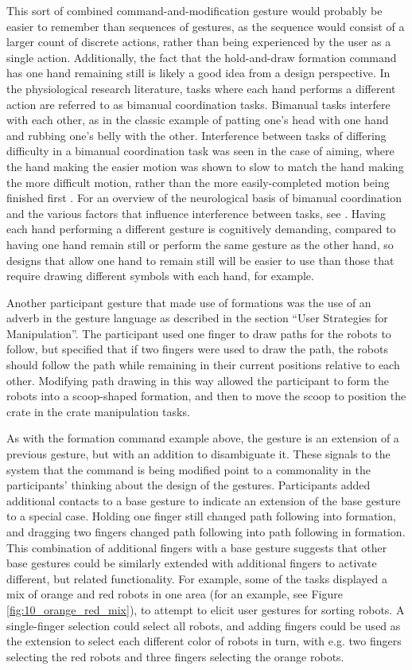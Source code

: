 This sort of combined command-and-modification gesture would probably be easier to remember than sequences of gestures, as the sequence would consist of a larger count of discrete actions, rather than being experienced by the user as a single action. 
Additionally, the fact that the hold-and-draw formation command has one hand remaining still is likely a good idea from a design perspective. 
In the physiological research literature, tasks where each hand performs a different action are referred to as bimanual coordination tasks.
Bimanual tasks interfere with each other, as in the classic example of patting one's head with one hand and rubbing one's belly with the other. 
Interference between tasks of differing difficulty in a bimanual coordination task was seen in the case of aiming, where the hand making the easier motion was shown to slow to match the hand making the more difficult motion, rather than the more easily-completed motion being finished first \citep{fitts1954information}.
For an overview of the neurological basis of bimanual coordination and the various factors that influence interference between tasks, see \citep{swinnen2004two}. 
Having each hand performing a different gesture is cognitively demanding, compared to having one hand remain still or perform the same gesture as the other hand, so designs that allow one hand to remain still will be easier to use than those that require drawing different symbols with each hand, for example. 

Another participant gesture that made use of formations was the use of an adverb in the gesture language as described in the section ``User Strategies for Manipulation''. 
The participant used one finger to draw paths for the robots to follow, but specified that if two fingers were used to draw the path, the robots should follow the path while remaining in their current positions relative to each other. 
Modifying path drawing in this way allowed the participant to form the robots into a scoop-shaped formation, and then to move the scoop to position the crate in the crate manipulation tasks. 

As with the formation command example above, the gesture is an extension of a previous gesture, but with an addition to disambiguate it. 
These signals to the system that the command is being modified point to a commonality in the participants' thinking about the design of the gestures. 
Participants added additional contacts to a base gesture to indicate an extension of the base gesture to a special case. 
Holding one finger still changed path following into formation, and dragging two fingers changed path following into path following in formation. 
This combination of additional fingers with a base gesture suggests that other base gestures could be similarly extended with additional fingers to activate different, but related functionality. 
For example, some of the tasks displayed a mix of orange and red robots in one area (for an example, see Figure \ref{fig:10_orange_red_mix}), to attempt to elicit user gestures for sorting robots. 
A single-finger selection could select all robots, and adding fingers could be used as the extension to select each different color of robots in turn, with e.g. two fingers selecting the red robots and three fingers selecting the orange robots. 

